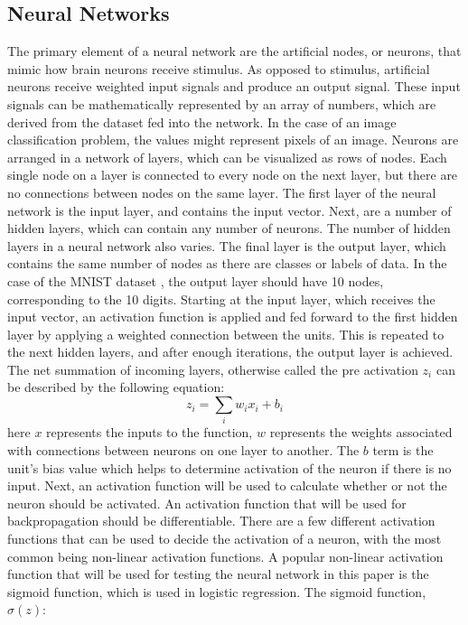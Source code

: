 \documentclass[twocolumn]{article}
\begin{document}
\subsection{Neural Networks}
The primary element of a neural network are the artificial nodes, or neurons, that mimic how brain neurons receive stimulus. As opposed to stimulus, artificial neurons receive weighted input signals and produce an output signal.\cite{gursen} These input signals can be mathematically represented by an array of numbers, which are derived from the dataset fed into the network. In the case of an image classification problem, the values might represent pixels of an image. \cite{nielsen1} Neurons are arranged in a network of layers, which can be visualized as rows of nodes. Each single node on a layer is connected to every node on the next layer, but there are no connections between nodes on the same layer. \cite{nielsen1} The first layer of the neural network is the input layer, and contains the input vector. Next, are a number of hidden layers, which can contain any number of neurons. The number of hidden layers in a neural network also varies. The final layer is the output layer, which contains the same number of nodes as there are classes or labels of data. In the case of the MNIST dataset \cite{lecun2010mnist}, the output layer should have 10 nodes, corresponding to the 10 digits. Starting at the input layer, which receives the input vector, an activation function is applied and fed forward to the first hidden layer by applying a weighted connection between the units. This is repeated to the next hidden layers, and after enough iterations, the output layer is achieved.\cite{reid} The net summation of incoming layers, otherwise called the pre activation $z_{i}$ can be described by the following equation: 
\begin{equation}z_{i} = \sum_{i}w_{i}x_{i}+b_{i}
\end{equation}
here $x$ represents the inputs to the function, $w$ represents the weights associated with connections between neurons on one layer to another. \cite{reid}  The $b$ term is the unit's bias value which helps to determine activation of the neuron if there is no input. Next, an activation function will be used to calculate whether or not the neuron should be activated. An activation function that will be used for backpropagation should be differentiable. \cite{tom} There are a few different activation functions that can be used to decide the activation of a neuron, with the most common being non-linear activation functions. A popular non-linear activation function that will be used for testing the neural network in this paper is the sigmoid function, which is used in logistic regression.\cite{reid} The sigmoid function, $\sigma(z)$:
\end{document}
